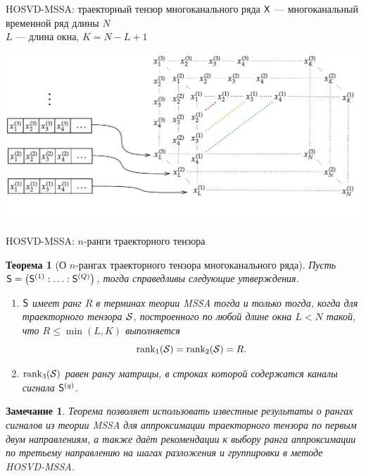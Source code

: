 \documentclass[pdf, unicode, 9pt, notheorems, handout]{beamer}
\newtheorem{theorem}{Теорема}
\newtheorem{remark}{Замечание}
\begin{document}
    \begin{frame}{HOSVD-MSSA: траекторный тензор многоканального ряда}
        $\mathsf{X}$ --- многоканальный временной ряд длины $N$\\
        $L$ --- длина окна, $K=N-L+1$ 
        
        \vspace{0.4cm}
        
        \centering
        \includegraphics[width=\textwidth]{./img/mssa_injection_new}
    \end{frame}
    
    \begin{frame}{HOSVD-MSSA: $n$-ранги траекторного тензора}
        \begin{theorem}[О $n$-рангах траекторного тензора многоканального ряда]
            Пусть $\mathsf{S} = \left(\mathsf{S}^{(1)} : \ldots : \mathsf{S}^{(Q)}\right)$, тогда справедливы следующие утверждения.
            \begin{enumerate}
                \item $\mathsf{S}$ имеет ранг $R$ в терминах теории \textup{MSSA} тогда и только тогда, когда для траекторного тензора $\mathcal{S}$, построенного по любой длине окна $L<N$ такой, что 
                $R \leqslant\min(L, K)$ выполняется 
                \[\operatorname{rank}_1(\mathcal{S}) = \operatorname{rank}_2(\mathcal{S}) = R.\]
                \item $\operatorname{rank}_3(\mathcal{S})$ равен рангу матрицы, 
                в строках которой содержатся каналы сигнала $\mathsf{S}^{(q)}$.
            \end{enumerate}
        \end{theorem}
        \vspace{0.2cm}
        \begin{remark}
            Теорема позволяет использовать известные результаты о рангах сигналов из теории \textup{MSSA}
            для аппроксимации траекторного тензора по первым двум направлениям, а также даёт рекомендации к
            выбору ранга аппроксимации по третьему направлению на шагах разложения и группировки в методе \textup{HOSVD-MSSA}.
        \end{remark}
    \end{frame}
    
\end{document}
